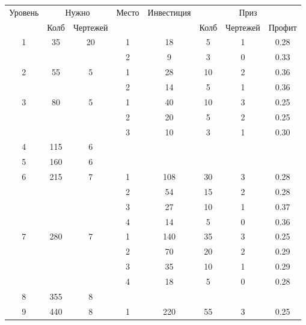 \begin{longtable}[c]{|c|c|c|c|c|c|c|c|}
    \hline
    \multirow{ 2}{*}{\small Уровень} &
    \multicolumn{2}{|c|}{\small Нужно} &
    \multirow{ 2}{*}{\small Место} & 
    \multirow{ 2}{*}{\small Инвестиция} & 
    \multicolumn{3}{|c|}{\small Приз} \\\cline{2-3}\cline{6-8}
    &
    {\small Колб} & 
    {\small Чертежей} & 
    & &
    {\small Колб} & 
    {\small Чертежей} & 
    {\small Профит}
    \\\hline\endhead
    \multirow{2}{*}{1} & \multirow{2}{*}{35} & \multirow{2}{*}{20} & 1 & 18 & 5 & 1 & 0.28 \\\cline{4-8}
    & & & 2 & 9 & 3 & 0 & 0.33 \\\hline
    \multirow{2}{*}{2} & \multirow{2}{*}{55} & \multirow{2}{*}{5} & 1 & 28 & 10 & 2 & 0.36 \\\cline{4-8}
    & & & 2 & 14 & 5 & 1 & 0.36 \\\hline
    \multirow{3}{*}{3} & \multirow{3}{*}{80} & \multirow{3}{*}{5} & 1 & 40 & 10 & 3 & 0.25 \\\cline{4-8}
    & & & 2 & 20 & 5 & 2 & 0.25 \\\cline{4-8}
    & & & 3 & 10 & 3 & 1 & 0.30 \\\hline
    \multirow{1}{*}{4} & \multirow{1}{*}{115} & \multirow{1}{*}{6} & & & & & \\\hline
    \multirow{1}{*}{5} & \multirow{1}{*}{160} & \multirow{1}{*}{6} & & & & & \\\hline
    \multirow{4}{*}{6} & \multirow{4}{*}{215} & \multirow{4}{*}{7} & 1 & 108 & 30 & 3 & 0.28 \\\cline{4-8}
    & & & 2 & 54 & 15 & 2 & 0.28 \\\cline{4-8}
    & & & 3 & 27 & 10 & 1 & 0.37 \\\cline{4-8}
    & & & 4 & 14 & 5 & 0 & 0.36 \\\hline
    \multirow{4}{*}{7} & \multirow{4}{*}{280} & \multirow{4}{*}{7} & 1 & 140 & 35 & 3 & 0.25 \\\cline{4-8}
    & & & 2 & 70 & 20 & 2 & 0.29 \\\cline{4-8}
    & & & 3 & 35 & 10 & 1 & 0.29 \\\cline{4-8}
    & & & 4 & 18 & 5 & 0 & 0.28 \\\hline
    \multirow{1}{*}{8} & \multirow{1}{*}{355} & \multirow{1}{*}{8} & & & & & \\\hline
    \multirow{4}{*}{9} & \multirow{4}{*}{440} & \multirow{4}{*}{8} & 1 & 220 & 55 & 3 & 0.25 \\\cline{4-8}

\end{longtable}
